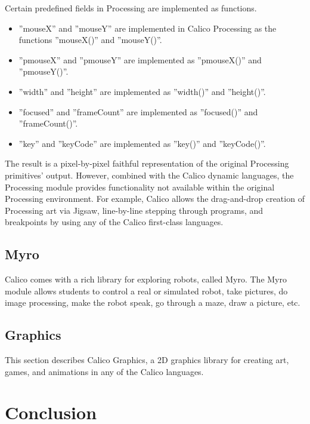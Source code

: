 \documentclass[preprint]{sigplanconf}
\begin{document}
Certain predefined fields in Processing are implemented as functions.

\begin{itemize}
\item ''mouseX'' and ''mouseY'' are implemented in Calico Processing as the functions ''mouseX()'' and ''mouseY()''.
\item ''pmouseX'' and ''pmouseY'' are implemented as ''pmouseX()'' and ''pmouseY()''.
\item ''width'' and ''height'' are implemented as ''width()'' and ''height()''.
\item ''focused'' and ''frameCount'' are implemented as ''focused()'' and ''frameCount()''.
\item ''key'' and ''keyCode'' are implemented as ''key()'' and ''keyCode()''.
\end{itemize}

The result is a pixel-by-pixel faithful representation of the original
Processing primitives' output. However, combined with the Calico
dynamic languages, the Processing module provides functionality not
available within the original Processing environment. For example,
Calico allows the drag-and-drop creation of Processing art via Jigsaw,
line-by-line stepping through programs, and breakpoints by using any
of the Calico first-class languages.

\subsection{Myro}

Calico comes with a rich library for exploring robots, called
Myro. The Myro module allows students to control a real or simulated
robot, take pictures, do image processing, make the robot speak, go
through a maze, draw a picture, etc.

\subsection{Graphics}

This section describes Calico Graphics, a 2D graphics library for
creating art, games, and animations in any of the Calico languages.

\section{Conclusion}

\end{document}
